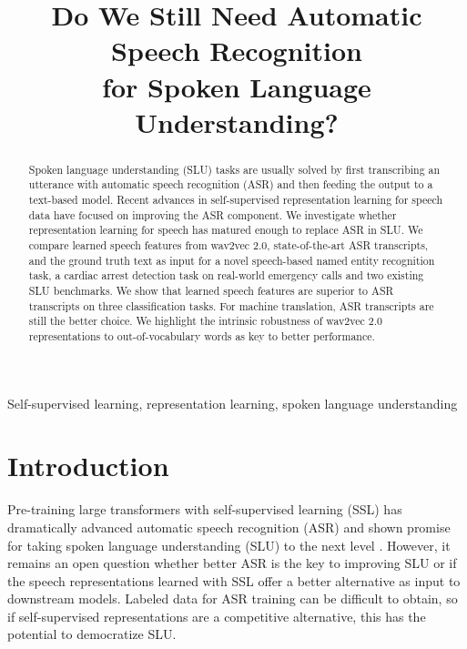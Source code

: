 \documentclass{article}
\title{Do We Still Need Automatic Speech Recognition\\for Spoken Language Understanding?}
\begin{document}
\maketitle
\begin{abstract}
Spoken language understanding (SLU) tasks are usually solved by first transcribing an utterance with automatic speech recognition (ASR) and then feeding the output to a text-based model. Recent advances in self-supervised representation learning for speech data have focused on improving the ASR component. We investigate whether representation learning for speech has matured enough to replace ASR in SLU. We compare learned speech features from wav2vec 2.0, state-of-the-art ASR transcripts, and the ground truth text as input for a novel speech-based named entity recognition task, a cardiac arrest detection task on real-world emergency calls and two existing SLU benchmarks. We show that learned speech features are superior to ASR transcripts on three classification tasks. For machine translation, ASR transcripts are still the better choice. We highlight the intrinsic robustness of wav2vec 2.0 representations to out-of-vocabulary words as key to better performance.





\end{abstract}
\begin{keywords}
Self-supervised learning, representation learning, spoken language understanding
\end{keywords}
\section{Introduction}
\label{sec:intro}



Pre-training large transformers with self-supervised learning (SSL) has dramatically advanced automatic speech recognition (ASR) \cite{baevski2020wav2vec} and shown promise for taking spoken language understanding (SLU) to the next level \cite{lai2021semi, yang2021superb}.  However, it remains an open question whether better ASR is the key to improving SLU or if the speech representations learned with SSL offer a better alternative as input to downstream models. Labeled data for ASR training can be difficult to obtain, so if self-supervised representations are a competitive alternative, this has the potential to democratize SLU.
\end{document}

